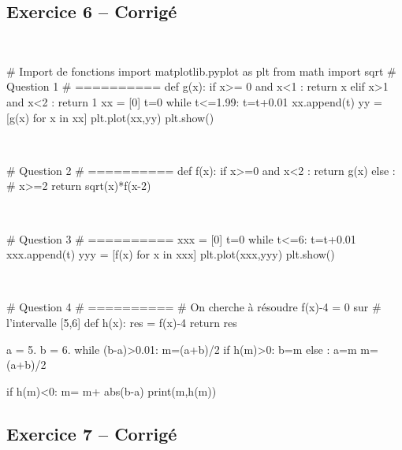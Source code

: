 \documentclass[10pt,fleqn]{article} %
\begin{document}
\begin{multicols}{2}
\columnbreak 

\subsection*{Exercice 6 -- Corrigé}
\begin{corrige}
$\quad$
\begin{python}
# Import de fonctions
import matplotlib.pyplot as plt
from math import sqrt
# Question 1 
# ==========
def g(x):
    if x>= 0 and x<1 :
        return x
    elif x>1 and x<2 :
        return 1
xx = [0]
t=0
while t<=1.99:
    t=t+0.01
    xx.append(t)
yy = [g(x) for x in xx]
plt.plot(xx,yy)
plt.show()
\end{python}
\end{corrige}

\begin{corrige}
$\quad$
\begin{python}
# Question 2
# ==========
def f(x):
    if x>=0 and x<2 :
        return g(x)
    else : # x>=2
        return sqrt(x)*f(x-2)
\end{python}
\end{corrige}

\begin{corrige}
$\quad$
\begin{python}
# Question 3
# ==========
xxx = [0]
t=0
while t<=6:
    t=t+0.01
    xxx.append(t)
yyy = [f(x) for x in xxx]
plt.plot(xxx,yyy)
plt.show()
\end{python}
\end{corrige}

\begin{corrige}
$\quad$
\begin{python}
# Question 4
# ==========
# On cherche à résoudre f(x)-4 = 0 sur
# l'intervalle [5,6]
def h(x):
    res = f(x)-4
    return res

a = 5.
b = 6.
while (b-a)>0.01:
    m=(a+b)/2
    if h(m)>0:
        b=m
    else :
        a=m
m=(a+b)/2

if h(m)<0:
    m= m+ abs(b-a)
print(m,h(m))
\end{python}
\end{corrige}

\newpage 

\subsection*{Exercice 7 -- Corrigé}


\end{multicols}
\end{document}
